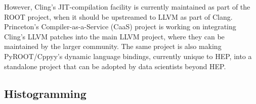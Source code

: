 \documentclass{article}
\begin{document}
However, Cling's JIT-compilation facility is currently maintained as part of the ROOT project, when it should be upstreamed to LLVM as part of Clang. Princeton's Compiler-as-a-Service (CaaS) project is working on integrating Cling's LLVM patches into the main LLVM project, where they can be maintained by the larger community. The same project is also making PyROOT/Cppyy's dynamic language bindings, currently unique to HEP, into a standalone project that can be adopted by data scientists beyond HEP.

\subsection{Histogramming}
\end{document}

